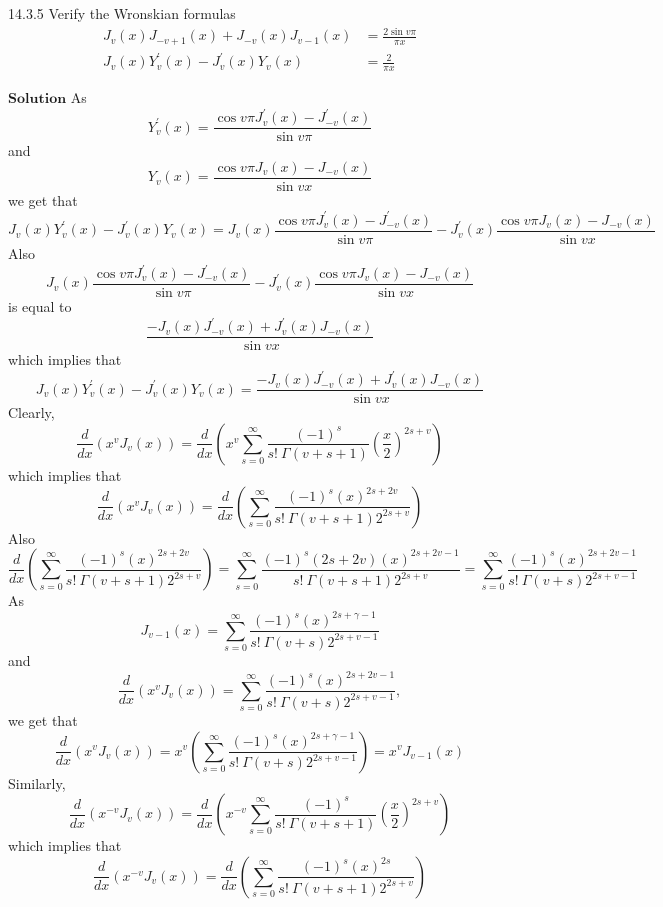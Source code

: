 \documentclass{article}
\begin{document}
\begin{flushleft}
\begin{mybox}{14.3.5}
Verify the Wronskian formulas
$$
\begin{aligned}
J_{v}(x) J_{-v+1}(x)+J_{-v}(x) J_{v-1}(x) &=\frac{2 \sin v \pi}{\pi x} \\
J_{v}(x) Y_{v}^{\prime}(x)-J_{v}^{\prime}(x) Y_{v}(x) &=\frac{2}{\pi x}
\end{aligned}
$$
\end{mybox}
$\boxed{\textbf{Solution}}$ As 
$$Y_{v}^{\prime}(x)=\frac{\cos v \pi J_{v}^{\prime}(x)-J_{-v}^{\prime}(x)}{\sin v \pi}$$ 
and 
$$Y_{v}(x)=\frac{\cos v \pi J_{v}(x)-J_{-v}(x)}{\sin v x}$$ 
we get that
$$J_{v}(x) Y_{v}^{\prime}(x)-J_{v}^{\prime}(x) Y_{v}(x)=J_{v}(x) \frac{\cos v \pi J_{v}^{\prime}(x)-J_{-v}^{\prime}(x)}{\sin v \pi}-J_{v}^{\prime}(x) \frac{\cos v \pi J_{v}(x)-J_{-v}(x)}{\sin v x}$$
Also 
$$J_{v}(x) \frac{\cos v \pi J_{v}^{\prime}(x)-J_{-v}^{\prime}(x)}{\sin v \pi}-J_{v}^{\prime}(x) \frac{\cos v \pi J_{v}(x)-J_{-v}(x)}{\sin v x}$$
is equal to
$$\frac{-J_{v}(x) J_{-v}^{\prime}(x)+J_{v}^{\prime}(x) J_{-v}(x)}{\sin v x}$$ 
which implies that
$$J_{v}(x) Y_{v}^{\prime}(x)-J_{v}^{\prime}(x) Y_{v}(x)=\frac{-J_{v}(x) J_{-v}^{\prime}(x)+J_{v}^{\prime}(x) J_{-v}(x)}{\sin v x}$$
Clearly, 
$$\frac{d}{d x}\left(x^{v} J_{v}(x)\right)=\frac{d}{d x}\left(x^{v} \sum_{s=0}^{\infty} \frac{(-1)^{s}}{s ! \  \Gamma(v+s+1)}\left(\frac{x}{2}\right)^{2 s+v}\right)$$ 
which implies that
$$\frac{d}{d x}\left(x^{v} J_{v}(x)\right)=\frac{d}{d x}\left(\sum_{s=0}^{\infty} \frac{(-1)^{s}(x)^{2 s+2 v}}{s ! \  \Gamma(v+s+1) 2^{2 s+v}}\right)$$
Also 
$$\frac{d}{d x}\left(\sum_{s=0}^{\infty} \frac{(-1)^{s}(x)^{2 s+2 v}}{s ! \  \Gamma(v+s+1) 2^{2 s+v}}\right)=\sum_{s=0}^{\infty} \frac{(-1)^{s}(2 s+2 v)(x)^{2 s+2 v-1}}{s ! \  \Gamma(v+s+1) 2^{2 s+v}}=\sum_{s=0}^{\infty} \frac{(-1)^{s}(x)^{2 s+2 v-1}}{s ! \  \Gamma(v+s) 2^{2 s+v-1}}$$
As 
$$J_{v-1}(x)=\sum_{s=0}^{\infty} \frac{(-1)^{s}(x)^{2 s+\gamma-1}}{s ! \  \Gamma(v+s) 2^{2 s+v-1}}$$
and 
$$\frac{d}{d x}\left(x^{v} J_{v}(x)\right)=\sum_{s=0}^{\infty} \frac{(-1)^{s}(x)^{2 s+2 v-1}}{s ! \  \Gamma(v+s) 2^{2 s+v-1}},$$ 
we get that
$$\frac{d}{d x}\left(x^{v} J_{v}(x)\right)=x^{v}\left(\sum_{s=0}^{\infty} \frac{(-1)^{s}(x)^{2 s+\gamma-1}}{s ! \  \Gamma(v+s) 2^{2 s+v-1}}\right)=x^{v} J_{v-1}(x)$$
Similarly, 
$$\frac{d}{d x}\left(x^{-v} J_{v}(x)\right)=\frac{d}{d x}\left(x^{-v} \sum_{s=0}^{\infty} \frac{(-1)^{s}}{s ! \  \Gamma(v+s+1)}\left(\frac{x}{2}\right)^{2 s+v}\right)$$ 
which implies that
$$\frac{d}{d x}\left(x^{-v} J_{v}(x)\right)=\frac{d}{d x}\left(\sum_{s=0}^{\infty} \frac{(-1)^{s}(x)^{2 s}}{s ! \  \Gamma(v+s+1) 2^{2 s+v}}\right)$$

\end{flushleft}
\end{document}
